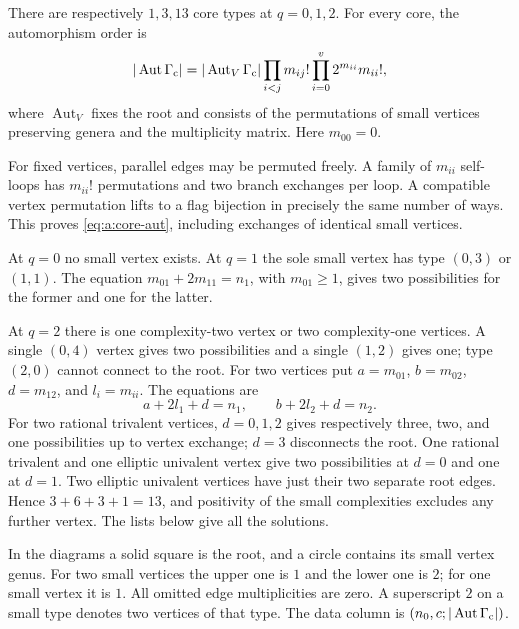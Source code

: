 \begin{lmm}\label{lmm:a:core-enumeration}
There are respectively $1,3,13$ core types at $q=0,1,2$. For every
core, the automorphism order is
\begin{equation}\label{eq:a:core-aut}
 |\operatorname{Aut}\Gamma_{\rm c}|=
 |\operatorname{Aut}_V\Gamma_{\rm c}|
       \prod_{i<j}m_{ij}!\prod_{i=0}^v2^{m_{ii}}m_{ii}!,
\end{equation}
where $\operatorname{Aut}_V$ fixes the root and consists of the
permutations of small vertices preserving genera and the multiplicity
matrix. Here $m_{00}=0$.
\end{lmm}
\begin{prf}
For fixed vertices, parallel edges may be permuted freely. A family
of $m_{ii}$ self-loops has $m_{ii}!$ permutations and two branch
exchanges per loop. A compatible vertex permutation lifts to a flag
bijection in precisely the same number of ways. This proves
\eqref{eq:a:core-aut}, including exchanges of identical small vertices.

At $q=0$ no small vertex exists. At $q=1$ the sole small vertex has
type $(0,3)$ or $(1,1)$. The equation $m_{01}+2m_{11}=n_1$,
with $m_{01}\geq1$, gives two possibilities for the former and one
for the latter.

At $q=2$ there is one complexity-two vertex or two complexity-one
vertices. A single $(0,4)$ vertex gives two possibilities and a single
$(1,2)$ gives one; type $(2,0)$ cannot connect to the root. For two
vertices put $a=m_{01}$, $b=m_{02}$, $d=m_{12}$, and $l_i=m_{ii}$.
The equations are
\[
 a+2l_1+d=n_1,\qquad b+2l_2+d=n_2.
\]
For two rational trivalent vertices, $d=0,1,2$ gives respectively
three, two, and one possibilities up to vertex exchange; $d=3$
disconnects the root. One rational trivalent and one elliptic univalent
vertex give two possibilities at $d=0$ and one at $d=1$. Two elliptic
univalent vertices have just their two separate root edges. Hence
$3+6+3+1=13$, and positivity of the small complexities excludes any
further vertex. The lists below give all the solutions.
\end{prf}

In the diagrams a solid square is the root, and a circle contains its
small vertex genus. For two small vertices the upper one is $1$ and
the lower one is $2$; for one small vertex it is $1$. All omitted
edge multiplicities are zero. A superscript $2$ on a small type denotes
two vertices of that type. The data column is
$(n_0,c;|\operatorname{Aut}\Gamma_{\rm c}|)$.

